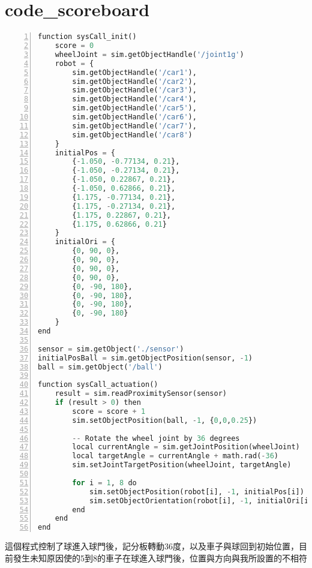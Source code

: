 \section{code\_scoreboard}
\begin{lstlisting}[language=Python, frame=single, numbers=left, captionpos=b, basicstyle=\ttfamily\small, showstringspaces=false, breaklines=true, tabsize=4, xleftmargin=15pt]
function sysCall_init()
    score = 0
    wheelJoint = sim.getObjectHandle('/joint1g')
    robot = {
        sim.getObjectHandle('/car1'),
        sim.getObjectHandle('/car2'),
        sim.getObjectHandle('/car3'),
        sim.getObjectHandle('/car4'),
        sim.getObjectHandle('/car5'),
        sim.getObjectHandle('/car6'),
        sim.getObjectHandle('/car7'),
        sim.getObjectHandle('/car8')
    }
    initialPos = {
        {-1.050, -0.77134, 0.21},
        {-1.050, -0.27134, 0.21},
        {-1.050, 0.22867, 0.21},
        {-1.050, 0.62866, 0.21},
        {1.175, -0.77134, 0.21},
        {1.175, -0.27134, 0.21},
        {1.175, 0.22867, 0.21},
        {1.175, 0.62866, 0.21}
    }
    initialOri = {
        {0, 90, 0},
        {0, 90, 0},
        {0, 90, 0},
        {0, 90, 0},
        {0, -90, 180},
        {0, -90, 180},
        {0, -90, 180},
        {0, -90, 180}
    }
end
 
sensor = sim.getObject('./sensor')
initialPosBall = sim.getObjectPosition(sensor, -1)
ball = sim.getObject('/ball')
 
function sysCall_actuation()
    result = sim.readProximitySensor(sensor)
    if (result > 0) then
        score = score + 1
        sim.setObjectPosition(ball, -1, {0,0,0.25})
         
        -- Rotate the wheel joint by 36 degrees
        local currentAngle = sim.getJointPosition(wheelJoint)
        local targetAngle = currentAngle + math.rad(-36)
        sim.setJointTargetPosition(wheelJoint, targetAngle)
         
        for i = 1, 8 do
            sim.setObjectPosition(robot[i], -1, initialPos[i])
            sim.setObjectOrientation(robot[i], -1, initialOri[i])
        end
    end
end
\end{lstlisting}
這個程式控制了球進入球門後，記分板轉動36度，以及車子與球回到初始位置，目前發生未知原因使的5到8的車子在球進入球門後，位置與方向與我所設置的不相符\\
